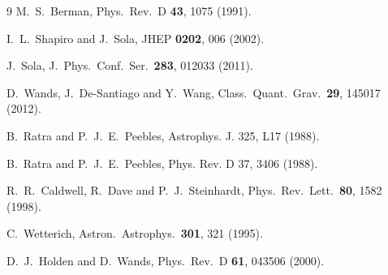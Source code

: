 \documentclass[prd,twocolumn,preprintnumbers,amsmath,amssymb,nofootinbib,english,showpacs]{revtex4-1}
\begin{document}
\begin{thebibliography}{9}
  M.~S.~Berman,
  Phys.\ Rev.\ D {\bf 43}, 1075 (1991).

  I.~L.~Shapiro and J.~Sola,
  JHEP {\bf 0202}, 006 (2002).

  J.~Sola,
  J.\ Phys.\ Conf.\ Ser.\  {\bf 283}, 012033 (2011).

  D.~Wands, J.~De-Santiago and Y.~Wang,
  Class.\ Quant.\ Grav.\  {\bf 29}, 145017 (2012).

 B.~Ratra and P.~J.~E.~Peebles,
  Astrophys. J. 325, L17 (1988).


  B.~Ratra and P.~J.~E.~Peebles,
  Phys. Rev. D 37, 3406 (1988).


  R.~R.~Caldwell, R.~Dave and P.~J.~Steinhardt,
  Phys.\ Rev.\ Lett.\  {\bf 80}, 1582 (1998).

  C.~Wetterich,
  Astron.\ Astrophys.\  {\bf 301}, 321 (1995).

  D.~J.~Holden and D.~Wands,
  Phys.\ Rev.\ D {\bf 61}, 043506 (2000).


\end{thebibliography}
\end{document}
